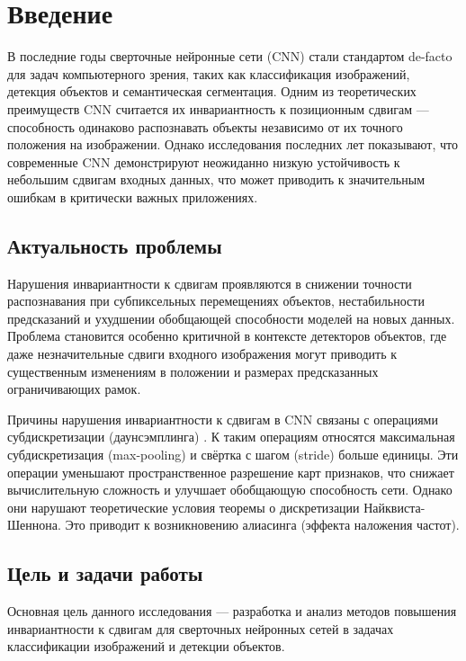 \section{Введение}
\label{sec:intro} 

В последние годы сверточные нейронные сети (CNN) стали стандартом de-facto для задач компьютерного зрения, таких как классификация изображений, детекция объектов и семантическая сегментация. Одним из теоретических преимуществ CNN считается их инвариантность к позиционным сдвигам — способность одинаково распознавать объекты независимо от их точного положения на изображении. Однако исследования последних лет показывают, что современные CNN демонстрируют неожиданно низкую устойчивость к небольшим сдвигам входных данных, что может приводить к значительным ошибкам в критически важных приложениях.

\subsection{Актуальность проблемы}

Нарушения инвариантности к сдвигам проявляются в снижении точности распознавания при субпиксельных перемещениях объектов, нестабильности предсказаний и ухудшении обобщающей способности моделей на новых данных. Проблема становится особенно критичной в контексте детекторов объектов, где даже незначительные сдвиги входного изображения могут приводить к существенным изменениям в положении и размерах предсказанных ограничивающих рамок.

Причины нарушения инвариантности к сдвигам в CNN связаны с операциями субдискретизации (даунсэмплинга) \cite{Zhang2019blurpool}. К таким операциям относятся максимальная субдискретизация (max-pooling) и свёртка с шагом (stride) больше единицы. Эти операции уменьшают пространственное разрешение карт признаков, что снижает вычислительную сложность и улучшает обобщающую способность сети. Однако они нарушают теоретические условия теоремы о дискретизации Найквиста-Шеннона. Это приводит к возникновению алиасинга (эффекта наложения частот).

\subsection{Цель и задачи работы}

Основная цель данного исследования — разработка и анализ методов повышения инвариантности к сдвигам для сверточных нейронных сетей в задачах классификации изображений и детекции объектов.

